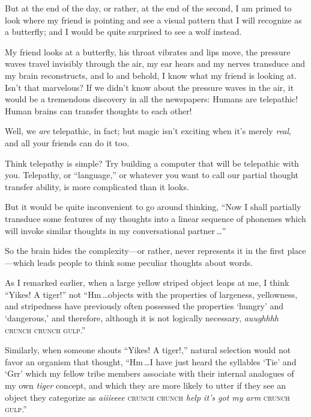 { But at the end of the day, or rather, at the end of the second, I
am primed to look where my friend is pointing and see a visual pattern
that I will recognize as a butterfly; and I would be quite surprised to
see a wolf instead.


 My friend looks at a butterfly, his throat vibrates and lips move,
the pressure waves travel invisibly through the air, my ear hears and
my nerves transduce and my brain reconstructs, and lo and behold, I
know what my friend is looking at. Isn't that
marvelous? If we didn't know about the pressure waves
in the air, it would be a tremendous discovery in all the newspapers:
Humans are telepathic! Human brains can transfer thoughts to each
other!


 Well, we \textit{are} telepathic, in fact; but magic
isn't exciting when it's merely
\textit{real}, and all your friends can do it too.


 Think telepathy is simple? Try building a computer that will be
telepathic with you. Telepathy, or
``language,'' or whatever you want
to call our partial thought transfer ability, is more complicated than
it looks.


 But it would be quite inconvenient to go around thinking,
``Now I shall partially transduce some features of my
thoughts into a linear sequence of phonemes which will invoke similar
thoughts in my conversational partner\,\ldots''


 So the brain hides the complexity---or rather, never represents it
in the first place---which leads people to think some peculiar thoughts
about words.

{
 As I remarked earlier, when a large yellow striped object leaps at
me, I think ``Yikes! A tiger!'' not
``Hm\,\ldots objects with the properties of largeness,
yellowness, and stripedness have previously often possessed the
properties `hungry' and
`dangerous,' and therefore, although it
is not logically necessary, \textit{auughhhh} \textsc{crunch crunch
gulp}.''}

{
 Similarly, when someone shouts ``Yikes! A
tiger!,'' natural selection would not favor an
organism that thought, ``Hm\,\ldots I have just heard
the syllables `Tie' and
`Grr' which my fellow tribe members
associate with their internal analogues of my own \textit{tiger}
concept, and which they are more likely to utter if they see an object
they categorize as \textit{aiiieeee} \textsc{crunch crunch} \textit{help
it's got my arm} \textsc{crunch gulp}.''}



}
